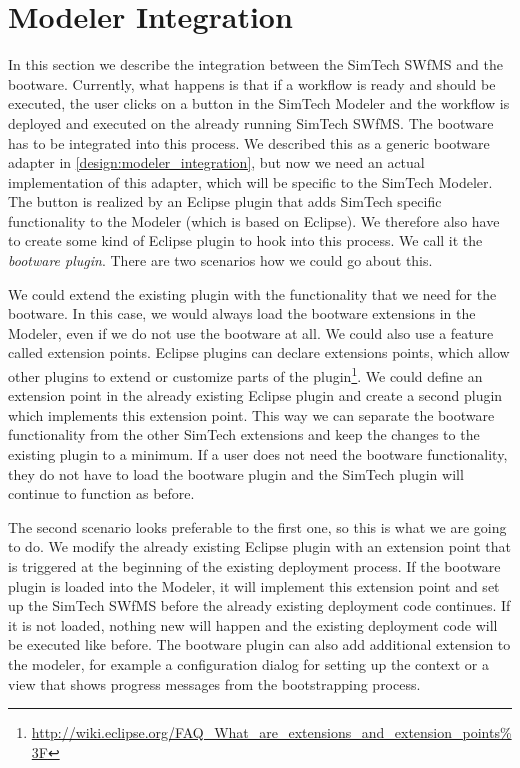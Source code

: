 \section{Modeler Integration}
\label{implementation:modeler_integration}

In this section we describe the integration between the SimTech SWfMS and the bootware.
Currently, what happens is that if a workflow is ready and should be executed, the user clicks on a button in the SimTech Modeler and the workflow is deployed and executed on the already running SimTech SWfMS.
The bootware has to be integrated into this process.
We described this as a generic bootware adapter in \autoref{design:modeler_integration}, but now we need an actual implementation of this adapter, which will be specific to the SimTech Modeler.
The button is realized by an Eclipse plugin that adds SimTech specific functionality to the Modeler (which is based on Eclipse).
We therefore also have to create some kind of Eclipse plugin to hook into this process.
We call it the \textit{bootware plugin}.
There are two scenarios how we could go about this.

We could extend the existing plugin with the functionality that we need for the bootware.
In this case, we would always load the bootware extensions in the Modeler, even if we do not use the bootware at all.
We could also use a feature called extension points.
Eclipse plugins can declare extensions points, which allow other plugins to extend or customize parts of the plugin\footnote{\url{http://wiki.eclipse.org/FAQ_What_are_extensions_and_extension_points\%3F}}.
We could define an extension point in the already existing Eclipse plugin and create a second plugin which implements this extension point.
This way we can separate the bootware functionality from the other SimTech extensions and keep the changes to the existing plugin to a minimum.
If a user does not need the bootware functionality, they do not have to load the bootware plugin and the SimTech plugin will continue to function as before.

The second scenario looks preferable to the first one, so this is what we are going to do.
We modify the already existing Eclipse plugin with an extension point that is triggered at the beginning of the existing deployment process.
If the bootware plugin is loaded into the Modeler, it will implement this extension point and set up the SimTech SWfMS before the already existing deployment code continues.
If it is not loaded, nothing new will happen and the existing deployment code will be executed like before.
The bootware plugin can also add additional extension to the modeler, for example a configuration dialog for setting up the context or a view that shows progress messages from the bootstrapping process.

